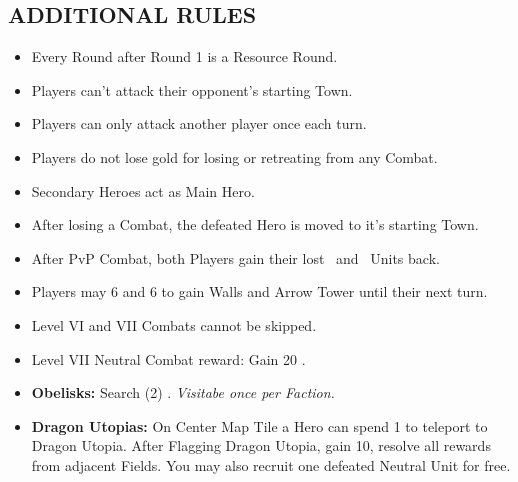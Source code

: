 \begin{multicols}{2}
\subsection*{\MakeUppercase{Additional Rules}}
\begin{itemize}
  \item Every Round after Round 1 is a Resource Round.
  \item Players can't attack their opponent's starting Town.
  \item Players can only attack another player once each turn.
  \item Players do not lose gold for losing or retreating from any Combat.
  \item Secondary Heroes act as Main Hero.
  \item After losing a Combat, the defeated Hero is moved to it's starting Town.
  \item After PvP Combat, both Players gain their lost \bronze\ and \silver\ Units back.
  \item Players may  6  and 6  to gain Walls and Arrow Tower until their next turn.
  \item Level VI and VII Combats cannot be skipped.
  \item Level VII Neutral Combat reward: Gain 20 .
  \item \textbf{Obelisks:} Search (2) . \textit{Visitabe once per Faction.}
  \item \textbf{Dragon Utopias:} On Center Map Tile a Hero can spend 1  to teleport to Dragon Utopia. After Flagging Dragon Utopia, gain 10, resolve all rewards from adjacent Fields. You may also recruit one defeated Neutral Unit for free.
\end{itemize}


\end{multicols}
